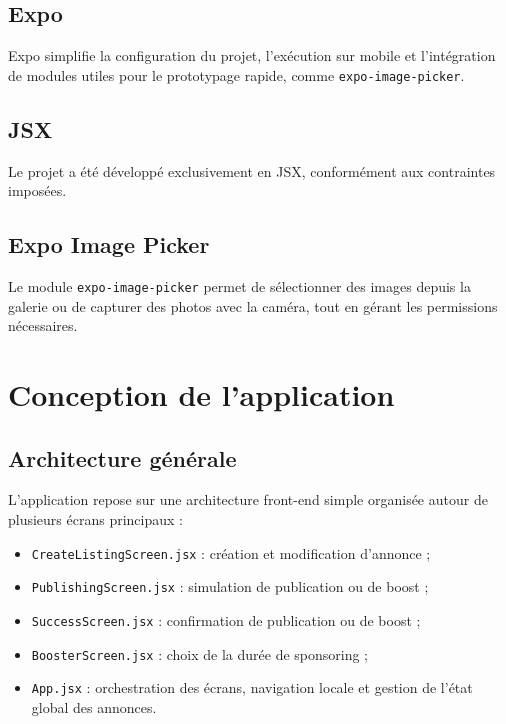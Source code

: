 \documentclass[12pt,a4paper]{report}
\begin{document}
\section{Expo}
Expo simplifie la configuration du projet, l'exécution sur mobile et l'intégration de modules utiles pour le prototypage rapide, comme \texttt{expo-image-picker}.

\section{JSX}
Le projet a été développé exclusivement en JSX, conformément aux contraintes imposées.

\section{Expo Image Picker}
Le module \texttt{expo-image-picker} permet de sélectionner des images depuis la galerie ou de capturer des photos avec la caméra, tout en gérant les permissions nécessaires.

\chapter{Conception de l'application}
\section{Architecture générale}
L'application repose sur une architecture front-end simple organisée autour de plusieurs écrans principaux :
\begin{itemize}
  \item \texttt{CreateListingScreen.jsx} : création et modification d'annonce ;
  \item \texttt{PublishingScreen.jsx} : simulation de publication ou de boost ;
  \item \texttt{SuccessScreen.jsx} : confirmation de publication ou de boost ;
  \item \texttt{BoosterScreen.jsx} : choix de la durée de sponsoring ;
  \item \texttt{App.jsx} : orchestration des écrans, navigation locale et gestion de l'état global des annonces.
\end{itemize}
\end{document}
